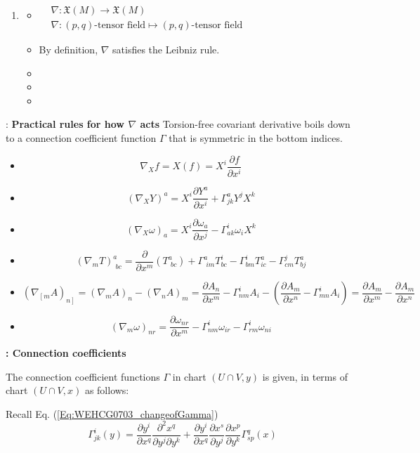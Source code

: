 \begin{enumerate}
\item[(b)] 
\begin{itemize}
\item $\begin{aligned} & \quad \\ & \nabla: \mathfrak{X}(M) \to \mathfrak{X}(M) \\
  & \nabla : (p,q)\text{-tensor field} \mapsto (p,q)\text{-tensor field} \end{aligned}$
\item By definition, $\nabla$ satisfies the Leibniz rule. 
\item
\item
\item
\end{itemize}
\end{enumerate}

: \textbf{Practical rules for how $\nabla$ acts}
Torsion-free covariant derivative boils down to a connection coefficient function $\Gamma$ that is symmetric in the bottom indices.

\begin{itemize}
\item \[
\nabla_Xf = X(f) = X^i \frac{ \partial f}{ \partial x^i }
\]
\item \[
(\nabla_X Y)^a = X^i \frac{ \partial Y^a}{ \partial x^i} + \Gamma^a_{jk} Y^j X^k 
\]
\item \[
(\nabla_X \omega)_a = X^i \frac{ \partial \omega_a}{ \partial x^j}  - \Gamma^i_{ak} \omega_i X^k
\]
\item \[
(\nabla_m T)^a_{ \, \, bc} = \frac{ \partial }{ \partial x^m} (T^a_{ \, \, bc} ) + \Gamma^a_{ \, \, im} T^i_{bc} - \Gamma^i_{bm} T^a_{ic} - \Gamma^j_{cm} T^a_{bj}
\]
\item \[
(\nabla_{ \left[ m \right. } A)_{ \left. n \right] } = (\nabla_m A)_n - (\nabla_n A)_m = \frac{ \partial A_n}{ \partial x^m } - \Gamma^i_{ nm} A_i - \left( \frac{ \partial A_m}{ \partial x^n} - \Gamma^i_{mn} A_i \right) = \frac{ \partial A_m}{ \partial x^m} - \frac{ \partial A_m}{ \partial x^n }
\]
\item \[
(\nabla_m \omega)_{nr} = \frac{ \partial \omega_{nr}}{ \partial x^m} - \Gamma^i_{nm } \omega_{ir} - \Gamma^i_{rm} \omega_{ni}
\]
\end{itemize}


\textbf{: Connection coefficients}

\questionhead{}

The connection coefficient functions $\Gamma$ in chart $(U \cap V,y)$ is given, in terms of chart $(U\cap V,x)$ as follows:

Recall Eq. (\ref{Eq:WEHCG0703_changeofGamma})
\[
\Gamma^i_{jk}(y) = \frac{ \partial y^i}{ \partial x^q} \frac{ \partial^2 x^q}{ \partial y^j \partial y^k} + \frac{ \partial y^i}{ \partial x^q } \frac{ \partial x^s }{ \partial y^j} \frac{ \partial x^p }{ \partial y^k} \Gamma^q_{sp}(x)
\]
